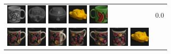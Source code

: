 \begin{figure}[tbp]
\begin{center}
\begin{tabular}{m{11cm} | m{3cm} |}
\includegraphics[width=1cm]{coil/beeld-48.eps}
\includegraphics[width=1cm]{coil/beeld-26.eps}
\includegraphics[width=1cm]{coil/beeld-28.eps}
\includegraphics[width=1cm]{coil/beeld-16.eps}
\includegraphics[width=1cm]{coil/beeld-31.eps}
& {\scriptsize 0.0}
\\
\includegraphics[width=1cm]{coil/beeld-60.eps}
\includegraphics[width=1cm]{coil/beeld-60.eps}
\includegraphics[width=1cm]{coil/beeld-64.eps}
\includegraphics[width=1cm]{coil/beeld-63.eps}
\includegraphics[width=1cm]{coil/beeld-61.eps}
\includegraphics[width=1cm]{coil/beeld-62.eps}
\includegraphics[width=1cm]{coil/beeld-16.eps}

\end{tabular}
\end{center}
\end{figure}
